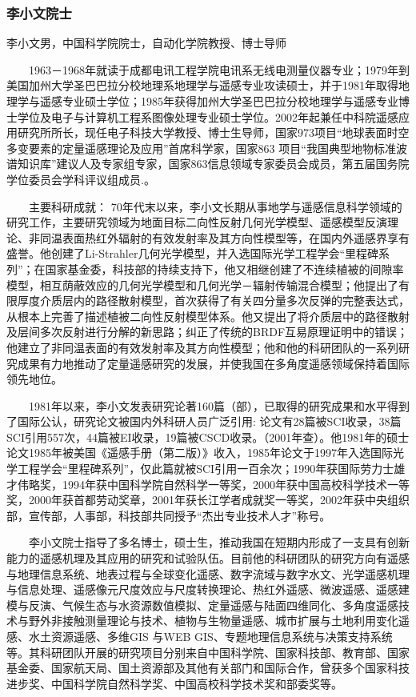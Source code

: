 \documentclass[UTF8]{ctexart}
\begin{document}
    \subsubsection{李小文院士}

    李小文男，中国科学院院士，自动化学院教授、博士导师

　　1963－1968年就读于成都电讯工程学院电讯系无线电测量仪器专业；1979年到美国加州大学圣巴巴拉分校地理系地理学与遥感专业攻读硕士，并于1981年取得地理学与遥感专业硕士学位；1985年获得加州大学圣巴巴拉分校地理学与遥感专业博士学位及电子与计算机工程系图像处理专业硕士学位。2002年起兼任中科院遥感应用研究所所长，现任电子科技大学教授、博士生导师，国家973项目“地球表面时空多变要素的定量遥感理论及应用”首席科学家，国家863 项目“我国典型地物标准波谱知识库”建议人及专家组专家，国家863信息领域专家委员会成员，第五届国务院学位委员会学科评议组成员.。

　　主要科研成就： 70年代末以来，李小文长期从事地学与遥感信息科学领域的研究工作，主要研究领域为地面目标二向性反射几何光学模型、遥感模型反演理论、非同温表面热红外辐射的有效发射率及其方向性模型等，在国内外遥感界享有盛誉。他创建了Li-Strahler几何光学模型，并入选国际光学工程学会“里程碑系列”；在国家基金委，科技部的持续支持下，他又相继创建了不连续植被的间隙率模型，相互荫蔽效应的几何光学模型和几何光学－辐射传输混合模型；他提出了有限厚度介质层内的路径散射模型，首次获得了有关四分量多次反弹的完整表达式，从根本上完善了描述植被二向性反射模型体系。他又提出了将介质层中的路径散射及层间多次反射进行分解的新思路；纠正了传统的BRDF互易原理证明中的错误；他建立了非同温表面的有效发射率及其方向性模型；他和他的科研团队的一系列研究成果有力地推动了定量遥感研究的发展，并使我国在多角度遥感领域保持着国际领先地位。

　　1981年以来，李小文发表研究论著160篇（部），已取得的研究成果和水平得到了国际公认，研究论文被国内外科研人员广泛引用: 论文有28篇被SCI收录，38篇SCI引用557次，44篇被EI收录，19篇被CSCD收录。（2001年查）。他1981年的硕士论文1985年被美国《遥感手册（第二版）》收入，1985年论文于1997年入选国际光学工程学会“里程碑系列”，仅此篇就被SCI引用一百余次；1990年获国际劳力士雄才伟略奖，1994年获中国科学院自然科学一等奖，2000年获中国高校科学技术一等奖，2000年获首都劳动奖章，2001年获长江学者成就奖一等奖，2002年获中央组织部，宣传部，人事部，科技部共同授予“杰出专业技术人才”称号。

　　李小文院士指导了多名博士，硕士生，推动我国在短期内形成了一支具有创新能力的遥感机理及其应用的研究和试验队伍。目前他的科研团队的研究方向有遥感与地理信息系统、地表过程与全球变化遥感、数字流域与数字水文、光学遥感机理与信息处理、遥感像元尺度效应与尺度转换理论、热红外遥感、微波遥感、遥感建模与反演、气候生态与水资源数值模拟、定量遥感与陆面四维同化、多角度遥感技术与野外非接触测量理论与技术、植物与生物量遥感、城市扩展与土地利用变化遥感、水土资源遥感、多维GIS 与WEB GIS、专题地理信息系统与决策支持系统等。其科研团队开展的研究项目分别来自中国科学院、国家科技部、教育部、国家基金委、国家航天局、国土资源部及其他有关部门和国际合作，曾获多个国家科技进步奖、中国科学院自然科学奖、中国高校科学技术奖和部委奖等。
\end{document}
